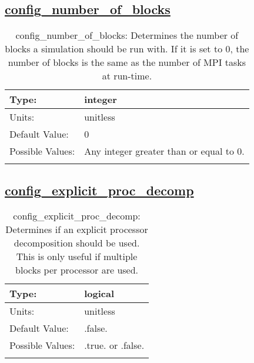 \subsection[config\_number\_of\_blocks]{\hyperref[sec:nm_tab_decomposition]{config\_number\_of\_blocks}}
\label{subsec:nm_sec_config_number_of_blocks}
\begin{center}
\begin{longtable}{| p{2.0in} || p{4.0in} |}
    \hline
    Type: & integer \\
    \hline
    Units: & \si{unitless} \\
    \hline
    Default Value: & 0 \\
    \hline
    Possible Values: & Any integer greater than or equal to 0. \\
    \hline
    \caption{config\_number\_of\_blocks: Determines the number of blocks a simulation should be run with. If it is set to 0, the number of blocks is the same as the number of MPI tasks at run-time.}
\end{longtable}
\end{center}
\subsection[config\_explicit\_proc\_decomp]{\hyperref[sec:nm_tab_decomposition]{config\_explicit\_proc\_decomp}}
\label{subsec:nm_sec_config_explicit_proc_decomp}
\begin{center}
\begin{longtable}{| p{2.0in} || p{4.0in} |}
    \hline
    Type: & logical \\
    \hline
    Units: & \si{unitless} \\
    \hline
    Default Value: & .false. \\
    \hline
    Possible Values: & .true. or .false. \\
    \hline
    \caption{config\_explicit\_proc\_decomp: Determines if an explicit processor decomposition should be used. This is only useful if multiple blocks per processor are used.}
\end{longtable}
\end{center}
